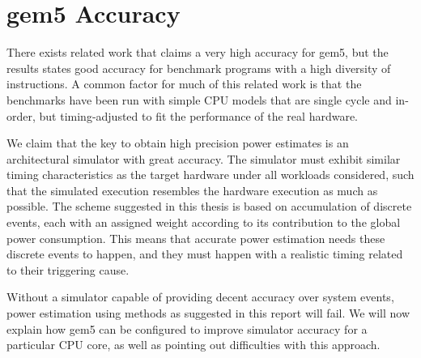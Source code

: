 \chapter{gem5 Accuracy}

There exists related work that claims a very high accuracy for
gem5\cite{butko2012accuracy,blem2013detailed}, but the results states good
accuracy for benchmark programs with a high diversity of instructions. A common
factor for much of this related work is that the benchmarks have been run with
simple CPU models that are single cycle and in-order, but timing-adjusted to fit
the performance of the real hardware.

We claim that the key to obtain high precision power estimates is an
architectural simulator with great accuracy. The simulator must exhibit similar
timing characteristics as the target hardware under all workloads considered,
such that the simulated execution resembles the hardware execution as much as
possible. The scheme suggested in this thesis is based on accumulation of
discrete events, each with an assigned weight according to its contribution to
the global power consumption. This means that accurate power estimation needs
these discrete events to happen, and they must happen with a realistic timing
related to their triggering cause.

Without a simulator capable of providing decent accuracy over system events,
power estimation using methods as suggested in this report will fail. We will
now explain how gem5 can be configured to improve simulator accuracy for a
particular CPU core, as well as pointing out difficulties with this approach.





